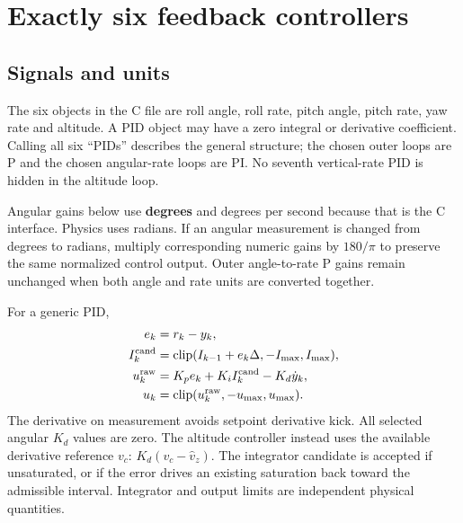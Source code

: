 \chapter{Exactly six feedback controllers}
\section{Signals and units}
The six objects in the C file are roll angle, roll rate, pitch angle, pitch
rate, yaw rate and altitude. A PID object may have a zero integral or
derivative coefficient. Calling all six ``PIDs'' describes the general
structure; the chosen outer loops are P and the chosen angular-rate loops
are PI. No seventh vertical-rate PID is hidden in the altitude loop.

Angular gains below use \textbf{degrees} and degrees per second because that
is the C interface. Physics uses radians. If an angular measurement is
changed from degrees to radians, multiply corresponding numeric gains by
$180/\pi$ to preserve the same normalized control output. Outer angle-to-rate
P gains remain unchanged when both angle and rate units are converted together.

For a generic PID,
\begin{align}
e_k&=r_k-y_k,\\
I_k^{\rm cand}&=\operatorname{clip}(I_{k-1}+e_k\Delta,-I_{\max},I_{\max}),\\
u_k^{\rm raw}&=K_pe_k+K_i I_k^{\rm cand}-K_d\dot y_k,\\
u_k&=\operatorname{clip}(u_k^{\rm raw},-u_{\max},u_{\max}).
\end{align}
The derivative on measurement avoids setpoint derivative kick. All selected
angular $K_d$ values are zero. The altitude controller instead uses the
available derivative reference $v_c$: $K_d(v_c-\hat v_z)$.
The integrator candidate is accepted if unsaturated, or if the error drives
an existing saturation back toward the admissible interval. Integrator and
output limits are independent physical quantities.

